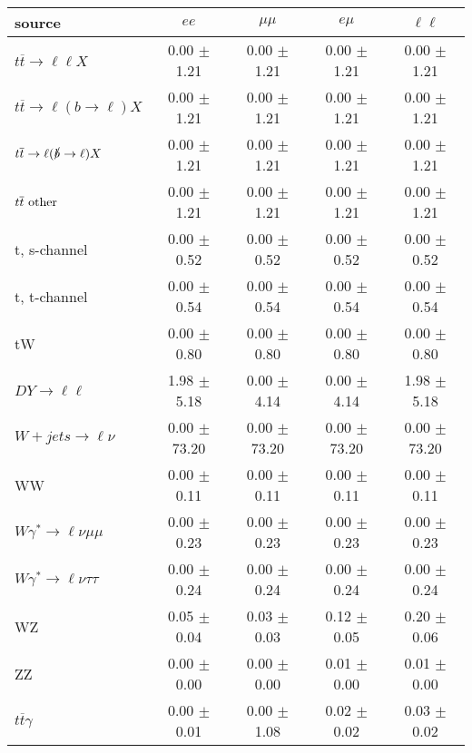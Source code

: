 \begin{tabular}{l|cccc} \hline\hline
source & $ee$ & $\mu\mu$ & $e\mu$ & $\ell\ell $ \\
\hline
$t\overline{t} \rightarrow \ell \ell X$ &  0.00 $\pm$  1.21 &  0.00 $\pm$  1.21 &  0.00 $\pm$  1.21 &  0.00 $\pm$  1.21 \\
$t\overline{t} \rightarrow \ell (b \rightarrow \ell) X$ &  0.00 $\pm$  1.21 &  0.00 $\pm$  1.21 &  0.00 $\pm$  1.21 &  0.00 $\pm$  1.21 \\
$t\overline{t} \rightarrow \ell (\slashed b \rightarrow \ell) X$ &  0.00 $\pm$  1.21 &  0.00 $\pm$  1.21 &  0.00 $\pm$  1.21 &  0.00 $\pm$  1.21 \\
        $t\overline{t}\ \rm{other}$ &  0.00 $\pm$  1.21 &  0.00 $\pm$  1.21 &  0.00 $\pm$  1.21 &  0.00 $\pm$  1.21 \\
\hline
                       t, s-channel &  0.00 $\pm$  0.52 &  0.00 $\pm$  0.52 &  0.00 $\pm$  0.52 &  0.00 $\pm$  0.52 \\
                       t, t-channel &  0.00 $\pm$  0.54 &  0.00 $\pm$  0.54 &  0.00 $\pm$  0.54 &  0.00 $\pm$  0.54 \\
                                 tW &  0.00 $\pm$  0.80 &  0.00 $\pm$  0.80 &  0.00 $\pm$  0.80 &  0.00 $\pm$  0.80 \\
\hline
         $DY \rightarrow \ell \ell$ &  1.98 $\pm$  5.18 &  0.00 $\pm$  4.14 &  0.00 $\pm$  4.14 &  1.98 $\pm$  5.18 \\
      $W+jets \rightarrow \ell \nu$ &  0.00 $\pm$ 73.20 &  0.00 $\pm$ 73.20 &  0.00 $\pm$ 73.20 &  0.00 $\pm$ 73.20 \\
                                 WW &  0.00 $\pm$  0.11 &  0.00 $\pm$  0.11 &  0.00 $\pm$  0.11 &  0.00 $\pm$  0.11 \\
\hline
$W\gamma^{*} \rightarrow \ell \nu \mu\mu$ &  0.00 $\pm$  0.23 &  0.00 $\pm$  0.23 &  0.00 $\pm$  0.23 &  0.00 $\pm$  0.23 \\
$W\gamma^{*} \rightarrow \ell \nu \tau\tau$ &  0.00 $\pm$  0.24 &  0.00 $\pm$  0.24 &  0.00 $\pm$  0.24 &  0.00 $\pm$  0.24 \\
                                 WZ &  0.05 $\pm$  0.04 &  0.03 $\pm$  0.03 &  0.12 $\pm$  0.05 &  0.20 $\pm$  0.06 \\
                                 ZZ &  0.00 $\pm$  0.00 &  0.00 $\pm$  0.00 &  0.01 $\pm$  0.00 &  0.01 $\pm$  0.00 \\
\hline
              $t\overline{t}\gamma$ &  0.00 $\pm$  0.01 &  0.00 $\pm$  1.08 &  0.02 $\pm$  0.02 &  0.03 $\pm$  0.02 \\

\end{tabular}

